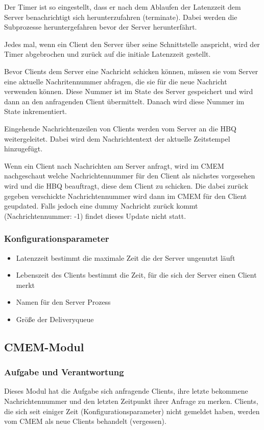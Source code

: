 \documentclass{article}
\begin{document}
Der Timer ist so eingestellt, dass er nach dem Ablaufen der Latenzzeit dem Server benachrichtigt sich herunterzufahren
(terminate). Dabei werden die Subprozesse heruntergefahren bevor der Server herunterfährt.

Jedes mal, wenn ein Client den Server über seine Schnittstelle anspricht, wird der Timer abgebrochen und zurück auf die
initiale Latenzzeit gestellt.

Bevor Clients dem Server eine Nachricht schicken können, müssen sie vom Server eine aktuelle Nachritennummer abfragen,
die sie für die neue Nachricht verwenden können. Diese Nummer ist im State des Server gespeichert und wird dann an den
anfragenden Client übermittelt. Danach wird diese Nummer im State inkrementiert.

Eingehende Nachrichtenzeilen von Clients werden vom Server an die HBQ weitergeleitet. Dabei wird dem Nachrichtentext der
aktuelle Zeitstempel hinzugefügt.

Wenn ein Client nach Nachrichten am Server anfragt, wird im CMEM nachgeschaut welche Nachrichtennummer für den Client
als nächstes vorgesehen wird und die HBQ beauftragt, diese dem Client zu schicken. Die dabei zurück gegeben verschickte
Nachrichtennummer wird dann im CMEM für den Client geupdated. Falls jedoch eine dummy Nachricht zurück kommt
(Nachrichtennummer: -1) findet dieses Update nicht statt.
			
\subsubsection{Konfigurationsparameter}
\begin{itemize}
    \item Latenzzeit bestimmt die maximale Zeit die der Server ungenutzt läuft
    \item Lebenszeit des Clients bestimmt die Zeit, für die sich der Server einen Client merkt
    \item Namen für den Server Prozess
    \item Größe der Deliveryqueue
\end{itemize}

\newpage

\subsection{CMEM-Modul}
\subsubsection{Aufgabe und Verantwortung}
Dieses Modul hat die Aufgabe sich anfragende Clients, ihre letzte bekommene Nachrichtennummer und den letzten Zeitpunkt ihrer Anfrage zu merken.
Clients, die sich seit einiger Zeit (Konfigurationsparameter) nicht gemeldet haben, werden vom CMEM als neue Clients behandelt (vergessen).
\end{document}
